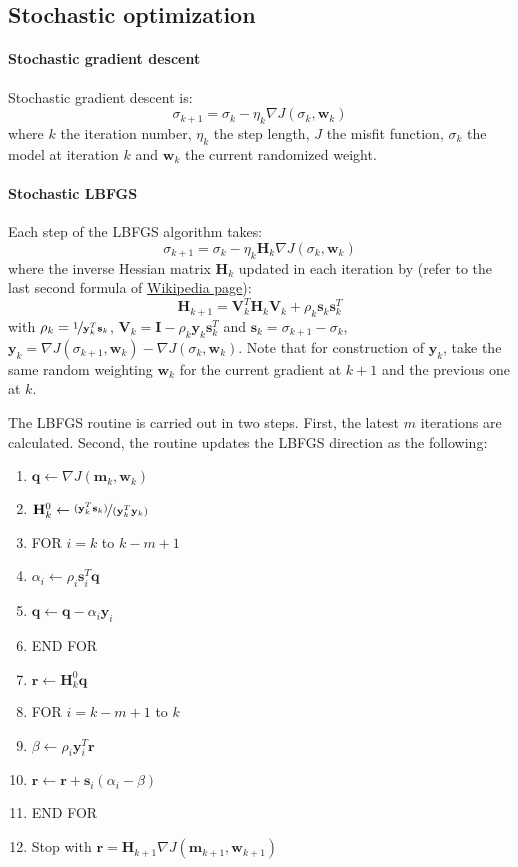 \documentclass{article}
\newcommand{\mbf}[1]{\mathbf{#1}}
\begin{document}
\subsection{Stochastic optimization}
\paragraph{Stochastic gradient descent}
Stochastic gradient descent is:
\[ \sigma_{k+1}=\sigma_k-\eta_k\nabla J(\sigma_k,\mbf w_k) \]
where $k$ the iteration number, $\eta_k$ the step length, $J$ the misfit function, $\sigma_k$ the model at iteration $k$ and $\mbf w_k$ the current randomized weight.\par
\paragraph{Stochastic LBFGS}
Each step of the LBFGS algorithm takes:
\[ \sigma_{k+1}=\sigma_k-\eta_k\mbf H_k\nabla J(\sigma_k,\mbf w_k) \]
where the inverse Hessian matrix $\mbf H_k$ updated in each iteration by (refer to the last second formula of \href{https://en.wikipedia.org/wiki/Broyden-Fletcher-Goldfarb-Shanno_algorithm}{Wikipedia page}):
\[ \mbf H_{k+1}=\mbf V_k^T\mbf H_k\mbf V_k+\rho_k\mbf s_k\mbf s_k^T \]
with $\rho_k=\nicefrac{1}{\mbf y_k^T\mbf s_k}$, $\mbf V_k=\mbf I-\rho_k\mbf y_k\mbf s_k^T$ and $\mbf s_k=\sigma_{k+1}-\sigma_k$, $\mbf y_k=\nabla J(\sigma_{k+1},\mbf w_k)-\nabla J(\sigma_k,\mbf w_k)$. Note that for construction of $\mbf y_k$, take the same random weighting $\mbf w_k$ for the current gradient at $k+1$ and the previous one at $k$.\par
The LBFGS routine is carried out in two steps. First, the latest $m$ iterations are calculated. Second, the routine updates the LBFGS direction as the following:
\begin{enumerate}[\hspace{15mm}1:~]
  \item $\mbf q\leftarrow\nabla J(\mbf m_k,\mbf w_k)$
  \item $\mbf H_k^0\leftarrow\nicefrac{(\mbf y_k^T\mbf s_k)}{(\mbf y_k^T\mbf y_k)}$
  \item FOR $i=k$ to $k-m+1$
  \item \quad\quad $\alpha_i\leftarrow\rho_i\mbf s_i^T\mbf q$
  \item \quad\quad $\mbf q\leftarrow\mbf q-\alpha_i\mbf y_i$
  \item END FOR
  \item $\mbf r\leftarrow\mbf H_k^0\mbf q$
  \item FOR $i=k-m+1$ to $k$
  \item \quad\quad $\beta\leftarrow\rho_i\mbf y_i^T\mbf r$
  \item \quad\quad $\mbf r\leftarrow\mbf r+\mbf s_i(\alpha_i-\beta)$
  \item END FOR
  \item Stop with $\mbf r=\mbf H_{k+1}\nabla J(\mbf m_{k+1},\mbf w_{k+1})$
\end{enumerate}%
\end{document}

